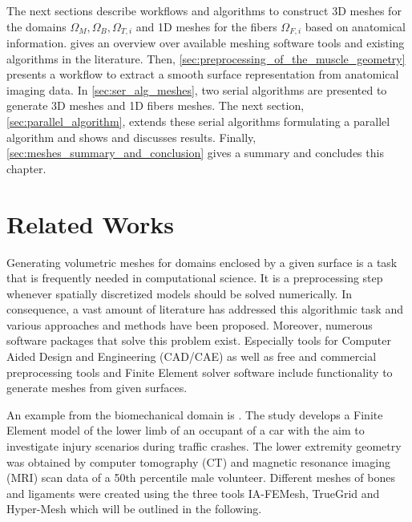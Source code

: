 The next sections describe workflows and algorithms to construct 3D meshes for the domains $\Omega_M,\Omega_B,\Omega_{T,i}$ and 1D meshes for the fibers $\Omega_{F,i}$ based on anatomical information.  gives an overview over available meshing software tools and existing algorithms in the literature. Then, \cref{sec:preprocessing_of_the_muscle_geometry} presents a workflow to extract a smooth surface representation from anatomical imaging data. In \cref{sec:ser_alg_meshes}, two serial algorithms are presented to generate 3D meshes and 1D fibers meshes. The next section, \cref{sec:parallel_algorithm}, extends these serial algorithms formulating a parallel algorithm and shows and discusses results. Finally, \cref{sec:meshes_summary_and_conclusion} gives a summary and concludes this chapter.

\section{Related Works}\label{sec:fiber_meshes_related_works}

Generating volumetric meshes for domains enclosed by a given surface is a task that is frequently needed in computational science. It is a preprocessing step whenever spatially discretized models should be solved numerically. In consequence, a vast amount of literature has addressed this algorithmic task and various approaches and methods have been proposed. Moreover, numerous software packages that solve this problem exist. Especially tools for Computer Aided Design and Engineering (CAD/CAE) as well as free and commercial preprocessing tools and Finite Element solver software include functionality to generate meshes from given surfaces.

An example from the biomechanical domain is \cite{untaroiu2013finite}. The study develops a Finite Element model of the lower limb of an occupant of a car with the aim to investigate injury scenarios during traffic crashes.
The lower extremity geometry was obtained by computer tomography (CT) and magnetic resonance imaging (MRI) scan data of a 50th percentile male volunteer. Different meshes of bones and ligaments were created using the three tools IA-FEMesh, TrueGrid and Hyper-Mesh which will be outlined in the following.

